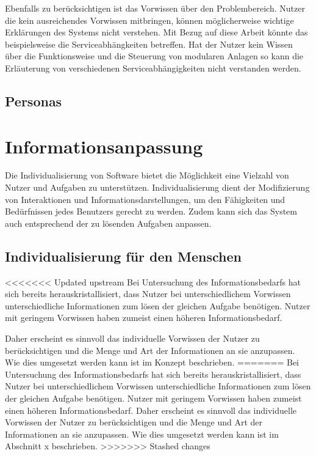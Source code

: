 Ebenfalls zu berücksichtigen ist das Vorwissen über den Problembereich. Nutzer die kein ausreichendes Vorwissen mitbringen, können möglicherweise wichtige Erklärungen des Systems nicht verstehen. Mit Bezug auf diese Arbeit könnte das beispielsweise die Serviceabhängkeiten betreffen. Hat der Nutzer kein Wissen über die Funktionsweise und die Steuerung von modularen Anlagen so kann die Erläuterung von verschiedenen Serviceabhängigkeiten nicht verstanden werden.

\subsection{Personas}


\section{Informationsanpassung}
Die Individualisierung von Software bietet die Möglichkeit eine Vielzahl von Nutzer und Aufgaben zu unterstützen. Individualisierung dient der Modifizierung von Interaktionen und Informationsdarstellungen, um den Fähigkeiten und Bedürfnissen jedes Benutzers gerecht zu werden. Zudem kann sich das System auch entsprechend der zu lösenden Aufgaben anpassen.

\subsection{Individualisierung für den Menschen}
<<<<<<< Updated upstream
Bei Untersuchung des Informationsbedarfs hat sich bereits herauskristallisiert, dass Nutzer bei unterschiedlichem Vorwissen unterschiedliche Informationen zum lösen der gleichen Aufgabe benötigen. Nutzer mit geringem Vorwissen haben zumeist einen höheren Informationsbedarf.

Daher erscheint es sinnvoll das individuelle Vorwissen der Nutzer zu berücksichtigen und die Menge und Art der Informationen an sie anzupassen. Wie dies umgesetzt werden kann ist im Konzept beschrieben.
=======
Bei Untersuchung des Informationsbedarfs hat sich bereits herauskristallisiert, dass Nutzer bei unterschiedlichem Vorwissen unterschiedliche Informationen zum lösen der gleichen Aufgabe benötigen. Nutzer mit geringem Vorwissen haben zumeist einen höheren Informationsbedarf. Daher erscheint es sinnvoll das individuelle Vorwissen der Nutzer zu berücksichtigen und die Menge und Art der Informationen an sie anzupassen. Wie dies umgesetzt werden kann ist im Abschnitt x beschrieben.
>>>>>>> Stashed changes

